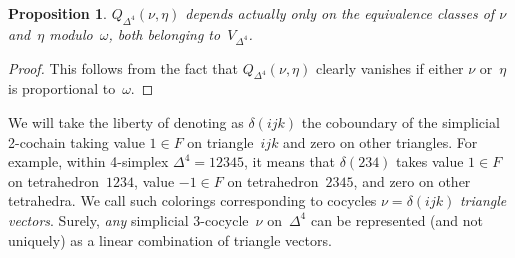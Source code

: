 \documentclass[12pt]{article}
\newtheorem{proposition}{Proposition}
\theoremstyle{definition}
\theoremstyle{remark}
\begin{document}
\begin{proposition}\label{p:Q}
$Q_{\Delta^4}(\nu,\eta)$ depends actually only on the equivalence classes of $\nu$ and~$\eta$ modulo~$\omega$, both belonging to~$V_{\Delta^4}$.
\end{proposition}

\begin{proof}
This follows from the fact that $Q_{\Delta^4}(\nu,\eta)$ clearly vanishes if either $\nu$ or~$\eta$ is proportional to~$\omega$.
\end{proof}

We will take the liberty of denoting as $\delta (ijk)$ the coboundary of the simplicial 2-cochain taking value $1\in F$ on triangle~$ijk$ and zero on other triangles. For example, within 4-simplex $\Delta^4 = 12345$, it means that $\delta (234)$ takes value $1\in F$ on tetrahedron~$1234$, value $-1\in F$ on tetrahedron~$2345$, and zero on other tetrahedra. We call such colorings corresponding to cocycles $\nu = \delta (ijk)$ \emph{triangle vectors}. Surely, \emph{any} simplicial 3-cocycle~$\nu$ on~$\Delta^4$ can be represented (and not uniquely) as a linear combination of triangle vectors.
\end{document}
